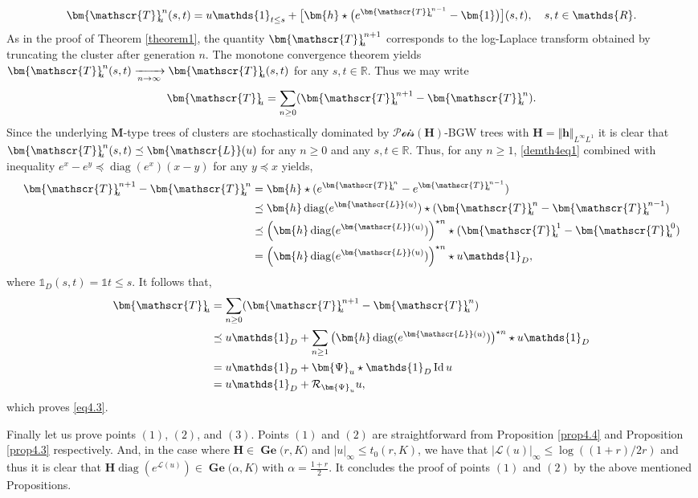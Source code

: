 \documentclass[reqno,final,11pt]{amsart}
\theoremstyle{plain}
\theoremstyle{definition}
\theoremstyle{remark}
\newcommand{\R}{\mathds{R}}
\newcommand{\ind}{\mathds{1}}
\newcommand{\M}{\bm{M}}
\newcommand{\Ge}[2]{\bm{\Gel(} #1,#2 \bm{)} }
\renewcommand{\L}{\bm{\mathscr{L}}}
\newcommand{\ones}{\bm{1}}
\newcommand{\h}{\bm{h}}
\newcommand{\bTa}[1]{\bm{\mathscr{T}}_{\mkern-7mu #1}}
\renewcommand{\H}{\bm{H}}
\newcommand{\Vityone}[1]{\Vert #1 \Vert_{L^{\infty}L^{1}}}
\newcommand{\Pois}{\mathscr{P}\!\mathscr{o}\!\mathscr{i}\!\mathscr{s}}
\newcommand{\Res}{\mathcal{R}}
\DeclareMathOperator{\diag}{diag}
\DeclareMathOperator{\Gel}{Ge}
\DeclareMathOperator{\Id}{Id}
\begin{document}
    \begin{equation}\label{demth4eq1}
    	\bTa{u}^n(s,t) = u \ind_{t\leq s} + \big[\h\star \big(e^{\bTa{u}^{n-1}}-\ones \big)\big](s,t), \quad s,t\in\R.
    \end{equation}
    As in the proof of Theorem \ref{theorem1}, the quantity $\bTa{u}^{n+1}$ corresponds to the log-Laplace transform obtained by truncating the cluster after generation $n$. The monotone convergence theorem yields $\bTa{u}^n(s,t) \xrightarrow[n\to\infty]{} \bTa{u}(s,t)$ for any $s,t\in\R$.
    Thus we may write
    \begin{equation*}
    	\bTa{u}  = \sum_{n\geq 0} (\bTa{u}^{n+1}-\bTa{u}^n).
    \end{equation*}
    Since the underlying $\M$-type trees of clusters are stochastically dominated by $\Pois(\H)$-BGW trees with $\H = \Vityone{\h}$ it is clear that $\bTa{u}^n(s,t) \preceq \L(u)$ for any $n\geq 0$ and  any $s,t\in\R$. Thus, for any $n\geq 1$, \eqref{demth4eq1} combined with inequality $e^x-e^y\preceq \diag(e^{x})(x-y)$ for any $y\preceq x$ yields,  
    \begin{align*}
    	\bTa{u}^{n+1}-\bTa{u}^n & = \h\star(e^{\bTa{u}^n}-e^{\bTa{u}^{n-1}})\\
    	& \preceq \h\diag(e^{\L(u)})\star (\bTa{u}^n-\bTa{u}^{n-1})\\
    	& \preceq \Big(\h\diag(e^{\L(u)})\Big)^{\star n} \star (\bTa{u}^{1}-\bTa{u}^{0})\\
    	& = \Big(\h\diag(e^{\L(u)})\Big)^{\star n} \star u\ind_{D},
    \end{align*}
    where $\ind_{D}(s,t) = \ind{t\leq s}$. It follows that,
    \begin{align*}
    	\bTa{u} & = \sum_{n\geq 0} (\bTa{u}^{n+1}-\bTa{u}^n)\\
    	& \preceq u\ind_{D} + \sum_{n\geq 1} \big(\h\diag(e^{\L(u)})\big)^{\star n} \star u\ind_{D}\\
    	& = u\ind_{D} + \bm{\Psi}_u \star \ind_{D} \Id  u\\
    	& = u\ind_{D} + \Res_{\bm{\Psi}_u} u,\\
    \end{align*}
    which proves \eqref{eq4.3}.
    
    Finally let us prove points $(1)$, $(2)$, and $(3)$. Points $(1)$ and $(2)$ are straightforward from Proposition \ref{prop4.4} and Proposition \ref{prop4.3} respectively. And, in the case where $\H \in \Ge{r}{K}$ and $\vert u\vert_{\infty} \leq t_0(r,K)$, we have that $\vert \L(u)\vert_{\infty} \leq \log((1+r)/2r)$ and thus it is clear that $\H\diag(e^{\L(u)}) \in\Ge{\alpha}{K}$ with $\alpha = \frac{1+r}{2}$. It concludes the proof of points $(1)$ and $(2)$ by the above mentioned Propositions.
    
\end{document}
